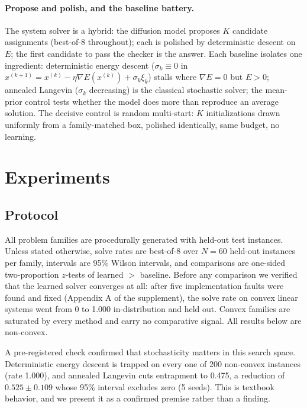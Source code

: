 \documentclass[letterpaper]{article} %
\begin{document}
\paragraph{Propose and polish, and the baseline battery.}
The system solver is a hybrid: the diffusion model proposes $K$ candidate assignments
(best-of-8 throughout); each is polished by deterministic descent on $E$; the first candidate
to pass the checker is the answer. Each baseline isolates one ingredient: deterministic energy descent ($\sigma_k \equiv 0$ in
$x^{(k+1)} = x^{(k)} - \eta \nabla E(x^{(k)}) + \sigma_k \xi_k$) stalls where
$\nabla E = 0$ but $E > 0$; annealed Langevin ($\sigma_k$ decreasing) is the classical
stochastic solver; the mean-prior control tests whether the model does more than reproduce
an average solution. The decisive control is random multi-start: $K$ initializations drawn
uniformly from a family-matched box, polished identically, same budget, no learning.

\section{Experiments}
\label{sec:experiments}

\subsection{Protocol}
\label{sec:entrapment}

All problem families are procedurally generated with held-out test instances. Unless stated
otherwise, solve rates are best-of-8 over $N = 60$ held-out instances per family, intervals
are 95\% Wilson intervals, and comparisons are one-sided two-proportion $z$-tests of
learned $>$ baseline. Before any comparison we
verified that the learned solver converges at all: after five implementation faults were found
and fixed (Appendix A of the supplement), the solve rate on convex linear systems
went from 0 to 1.000 in-distribution and held out. Convex families are saturated by every
method and carry no comparative signal. All results below are non-convex.

A pre-registered check confirmed that stochasticity matters in
this search space. Deterministic energy descent is trapped on
every one of 200 non-convex instances (rate 1.000), and annealed Langevin cuts entrapment to
0.475, a reduction of $0.525 \pm 0.109$ whose 95\% interval excludes zero (5 seeds). This is
textbook behavior, and we present it as a confirmed premise rather than a finding.
\end{document}
